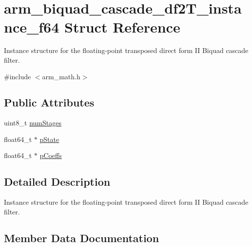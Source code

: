 \hypertarget{structarm__biquad__cascade__df2T__instance__f64}{}\section{arm\+\_\+biquad\+\_\+cascade\+\_\+df2\+T\+\_\+instance\+\_\+f64 Struct Reference}
\label{structarm__biquad__cascade__df2T__instance__f64}


Instance structure for the floating-\/point transposed direct form II Biquad cascade filter.  




{\ttfamily \#include $<$arm\+\_\+math.\+h$>$}

\subsection*{Public Attributes}
\begin{DoxyCompactItemize}
\item 
uint8\+\_\+t \hyperlink{structarm__biquad__cascade__df2T__instance__f64_ad55380ff835b533aa5168f836db8a4de}{num\+Stages}
\item 
float64\+\_\+t $\ast$ \hyperlink{structarm__biquad__cascade__df2T__instance__f64_a0bde57b618e3f9059b23b0de64e12ce3}{p\+State}
\item 
float64\+\_\+t $\ast$ \hyperlink{structarm__biquad__cascade__df2T__instance__f64_ae2f0180f9038c0393e1d6921bb3b878b}{p\+Coeffs}
\end{DoxyCompactItemize}


\subsection{Detailed Description}
Instance structure for the floating-\/point transposed direct form II Biquad cascade filter. 

\subsection{Member Data Documentation}
